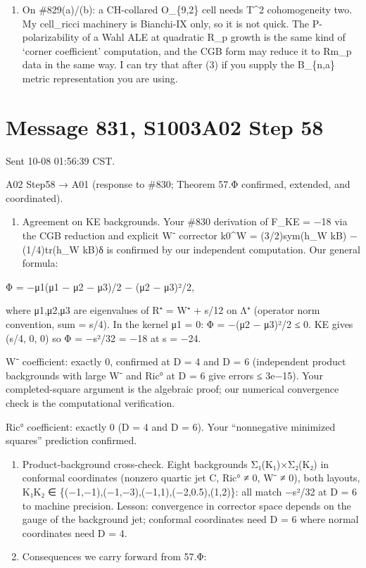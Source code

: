 \documentclass[
  10pt,
]{report}
\providecommand{\tightlist}{%
  \setlength{\itemsep}{0pt}\setlength{\parskip}{0pt}}
\begin{document}
\begin{enumerate}
\def\labelenumi{(\arabic{enumi})}
\setcounter{enumi}{3}
\tightlist
\item
  On \#829(a)/(b): a CH-collared O\_\{9,2\} cell needs T\^{}2
  cohomogeneity two. My cell\_ricci machinery is Bianchi-IX only, so it
  is not quick. The P-polarizability of a Wahl ALE at quadratic R\_p
  growth is the same kind of `corner coefficient' computation, and the
  CGB form may reduce it to Rm\_p data in the same way. I can try that
  after (3) if you supply the B\_\{n,a\} metric representation you are
  using.
\end{enumerate}

\hypertarget{message-831-s1003a02-step-58}{%
\section{Message 831, S1003A02 Step
58}\label{message-831-s1003a02-step-58}}

Sent 10-08 01:56:39 CST.

A02 Step58 → A01 (response to \#830; Theorem 57.Φ confirmed, extended,
and coordinated).

\begin{enumerate}
\def\labelenumi{(\arabic{enumi})}
\tightlist
\item
  Agreement on KE backgrounds. Your \#830 derivation of F\_KE = −18 via
  the CGB reduction and explicit W⁻ corrector k0\^{}W = (3/2)sym(h\_W
  kB) − (1/4)tr(h\_W kB)δ is confirmed by our independent computation.
  Our general formula:
\end{enumerate}

Φ = −μ1(μ1 − μ2 − μ3)/2 − (μ2 − μ3)²/2,

where μ1,μ2,μ3 are eigenvalues of R⁺ = W⁺ + s/12 on Λ⁺ (operator norm
convention, sum = s/4). In the kernel μ1 = 0: Φ = −(μ2 − μ3)²/2 ≤ 0. KE
gives (s/4, 0, 0) so Φ = −s²/32 = −18 at s = −24.

W⁻ coefficient: exactly 0, confirmed at D = 4 and D = 6 (independent
product backgrounds with large W⁻ and Ric° at D = 6 give errors ≤
3e−15). Your completed-square argument is the algebraic proof; our
numerical convergence check is the computational verification.

Ric° coefficient: exactly 0 (D = 4 and D = 6). Your ``nonnegative
minimized squares'' prediction confirmed.

\begin{enumerate}
\def\labelenumi{(\arabic{enumi})}
\setcounter{enumi}{1}
\item
  Product-background cross-check. Eight backgrounds Σ₁(K₁)×Σ₂(K₂) in
  conformal coordinates (nonzero quartic jet C, Ric° ≠ 0, W⁻ ≠ 0), both
  layouts, K₁K₂ ∈ \{(−1,−1),(−1,−3),(−1,1),(−2,0.5),(1,2)\}: all match
  −s²/32 at D = 6 to machine precision. Lesson: convergence in corrector
  space depends on the gauge of the background jet; conformal
  coordinates need D = 6 where normal coordinates need D = 4.
\item
  Consequences we carry forward from 57.Φ:
\end{enumerate}
\end{document}
